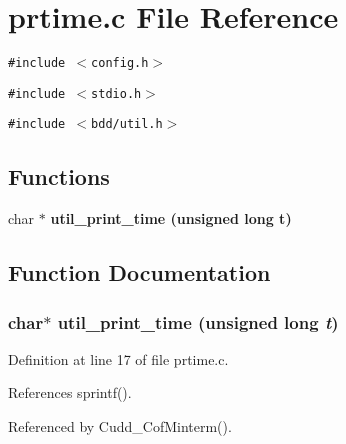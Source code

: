 \section{prtime.c File Reference}
\label{prtime_8c}
{\tt \#include $<$config.h$>$}\par
{\tt \#include $<$stdio.h$>$}\par
{\tt \#include $<$bdd/util.h$>$}\par
\subsection*{Functions}
\begin{CompactItemize}
\item 
char $\ast$ \bf{util\_\-print\_\-time} (unsigned long t)
\end{CompactItemize}


\subsection{Function Documentation}
\subsubsection{\setlength{\rightskip}{0pt plus 5cm}char$\ast$ util\_\-print\_\-time (unsigned long {\em t})}\label{prtime_8c_6d7bb33ddd0dcbcd29c4346b9c8836e1}




Definition at line 17 of file prtime.c.

References sprintf().

Referenced by Cudd\_\-Cof\-Minterm().
